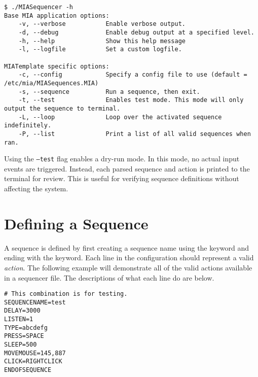 \begin{lstlisting}[style=terminalstyle]
$ ./MIASequencer -h
Base MIA application options:
	-v, --verbose           Enable verbose output.
	-d, --debug             Enable debug output at a specified level.
	-h, --help              Show this help message
	-l, --logfile           Set a custom logfile.

MIATemplate specific options:
	-c, --config            Specify a config file to use (default = /etc/mia/MIASequences.MIA)
	-s, --sequence          Run a sequence, then exit.
	-t, --test              Enables test mode. This mode will only output the sequence to terminal.
	-L, --loop              Loop over the activated sequence indefinitely.
	-P, --list              Print a list of all valid sequences when ran.
\end{lstlisting}

Using the \texttt{--test} flag enables a dry-run mode. In this mode, no actual input events are triggered. Instead, each parsed sequence and action is printed to the terminal for review. This is useful for verifying sequence definitions without affecting the system.


\section{Defining a Sequence}

A sequence is defined by first creating a sequence name using the  keyword and ending with the  keyword. Each line in the configuration should represent a valid \textit{action}. The following example will demonstrate all of the valid actions available in a sequencer file. The descriptions of what each line do are below.

\begin{lstlisting}[style=pythonstyle]
# This combination is for testing.
SEQUENCENAME=test
DELAY=3000
LISTEN=1
TYPE=abcdefg
PRESS=SPACE
SLEEP=500
MOVEMOUSE=145,887
CLICK=RIGHTCLICK
ENDOFSEQUENCE
\end{lstlisting}


